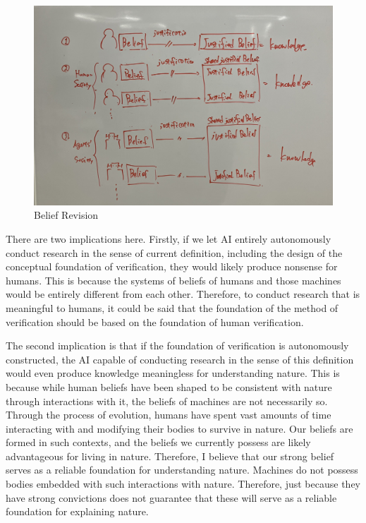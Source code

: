 \documentclass{article}
\begin{document}
\begin{figure}[htb]
    \centering
    \includegraphics[width=\linewidth]{figs/shared_belief_revision.jpg}
    \caption{Belief Revision}
    \label{fig:shared_belief_revision}
\end{figure}

There are two implications here. Firstly, if we let AI entirely autonomously conduct research in the sense of current definition, including the design of the conceptual foundation of verification, they would likely produce nonsense for humans. This is because the systems of beliefs of humans and those machines would be entirely different from each other. Therefore, to conduct research that is meaningful to humans, it could be said that the foundation of the method of verification should be based on the foundation of human verification.

The second implication is that if the foundation of verification is autonomously constructed, the AI capable of conducting research in the sense of this definition would even produce knowledge meaningless for understanding nature. This is because while human beliefs have been shaped to be consistent with nature through interactions with it, the beliefs of machines are not necessarily so. Through the process of evolution, humans have spent vast amounts of time interacting with and modifying their bodies to survive in nature. Our beliefs are formed in such contexts, and the beliefs we currently possess are likely advantageous for living in nature. Therefore, I believe that our strong belief serves as a reliable foundation for understanding nature. Machines do not possess bodies embedded with such interactions with nature. Therefore, just because they have strong convictions does not guarantee that these will serve as a reliable foundation for explaining nature. 
\end{document}
